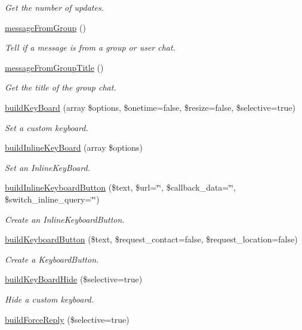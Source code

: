 \begin{DoxyCompactItemize}
\begin{DoxyCompactList}\small\item\em Get the number of updates. \end{DoxyCompactList}\item 
\hyperlink{class_telegram_a59b7bf91ea3b26d732f7536c2d65da19}{message\+From\+Group} ()
\begin{DoxyCompactList}\small\item\em Tell if a message is from a group or user chat. \end{DoxyCompactList}\item 
\hyperlink{class_telegram_acd2c4c8c6f15dbb1f25af2f539c2ec16}{message\+From\+Group\+Title} ()
\begin{DoxyCompactList}\small\item\em Get the title of the group chat. \end{DoxyCompactList}\item 
\hyperlink{class_telegram_a5c9619923ae1810aa340fa0e9acc1744}{build\+Key\+Board} (array \$options, \$onetime=false, \$resize=false, \$selective=true)
\begin{DoxyCompactList}\small\item\em Set a custom keyboard. \end{DoxyCompactList}\item 
\hyperlink{class_telegram_a81212e5e1fe0b3f72dd503a71577bbc4}{build\+Inline\+Key\+Board} (array \$options)
\begin{DoxyCompactList}\small\item\em Set an Inline\+Key\+Board. \end{DoxyCompactList}\item 
\hyperlink{class_telegram_acb9d27401f6095212d6baf7d40ee1981}{build\+Inline\+Keyboard\+Button} (\$text, \$url=\char`\"{}\char`\"{}, \$callback\+\_\+data=\char`\"{}\char`\"{}, \$switch\+\_\+inline\+\_\+query=\char`\"{}\char`\"{})
\begin{DoxyCompactList}\small\item\em Create an Inline\+Keyboard\+Button. \end{DoxyCompactList}\item 
\hyperlink{class_telegram_a611a52a2e9be838207b3943007a76b6c}{build\+Keyboard\+Button} (\$text, \$request\+\_\+contact=false, \$request\+\_\+location=false)
\begin{DoxyCompactList}\small\item\em Create a Keyboard\+Button. \end{DoxyCompactList}\item 
\hyperlink{class_telegram_a3a02a8bbaf6021f98871752bfd32de97}{build\+Key\+Board\+Hide} (\$selective=true)
\begin{DoxyCompactList}\small\item\em Hide a custom keyboard. \end{DoxyCompactList}\item 
\hypertarget{class_telegram_a34cfc8575c348ca3dd168b9611af4f1c}{}\hyperlink{class_telegram_a34cfc8575c348ca3dd168b9611af4f1c}{build\+Force\+Reply} (\$selective=true)\label{class_telegram_a34cfc8575c348ca3dd168b9611af4f1c}


\end{DoxyCompactItemize}
